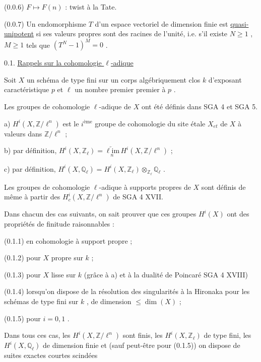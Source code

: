 (0.0.6)    $F \longmapsto F(n)$ : twist à la Tate.

(0.0.7)    Un endomorphisme  $T$  d'un espace vectoriel de dimension finie est \underline{quasi-unipotent} si ses valeurs propres sont des racines de l'unité, i.e. s'il existe $N \geqslant 1$ , $M \geqslant 1$  tels que $(T^N - 1)^M = 0$ .


0.1.  \underline{Rappels sur la cohomologie $\ell$-adique}

Soit  $X$  un schéma de type fini sur un corps algébriquement clos  $k$  d'exposant caractéristique  $p$  et  $\ell$  un nombre premier premier à  $p$ .

Les groupes de cohomologie $\ell$-adique de  $X$  ont été définis dans SGA 4 et SGA 5.

a) $H^i(X,\mathbb{Z}/\ell^n)$  est le $i^{\text{ème}}$ groupe de cohomologie du site étale  $X_{et}$  de  $X$  à valeurs dans  $\mathbb{Z}/\ell^n$ ;

b) par définition,  $H^i(X,\mathbb{Z}_\ell) = \underset{n}{\underleftarrow{\ell\mathrm{im}}}\, H^i(X,\mathbb{Z}/\ell^n)$  ;

c) par définition,  $H^i(X,\mathbb{Q}_\ell) = H^i(X,\mathbb{Z}_\ell) \otimes_{\mathbb{Z}_\ell} \mathbb{Q}_\ell$ .

Les groupes de cohomologie $\ell$-adique à supports propres de  $X$  sont définis de même à partir des  $H^i_c(X,\mathbb{Z}/\ell^n)$  de SGA 4 XVII.

Dans chacun des cas suivants, on sait prouver que ces groupes  $H^i(X)$  ont des propriétés de finitude raisonnables :

(0.1.1)    en cohomologie à support propre ;

(0.1.2)    pour  $X$  propre sur  $k$ ;

(0.1.3)    pour  $X$  lisse sur  $k$ (grâce à  a)  et à la dualité de Poincaré SGA 4 XVIII)

(0.1.4)    lorsqu'on dispose de la résolution des singularités à la Hironaka pour les schémas de type fini sur  $k$ , de dimension $\leqslant \dim(X)$ ;

(0.1.5)    pour  $i = 0, 1$ .



Dans tous ces cas, les  $H^i(X,\mathbb{Z}/\ell^n)$  sont finis, les $H^i(X,\mathbb{Z}_\ell)$  de type fini, les $H^i(X,\mathbb{Q}_\ell)$  de dimension finie et (sauf peut-être pour (0.1.5)) on dispose de suites exactes courtes scindées

